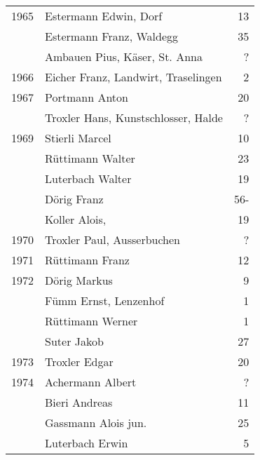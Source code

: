 {\begin{longtable}{ l l r }
        1965          & Estermann Edwin, Dorf                     & 13          \\
                      & Estermann Franz, Waldegg                  & 35          \\
                      & Ambauen Pius, Käser, St. Anna             & ?           \\
        1966          & Eicher Franz, Landwirt, Traselingen       & 2           \\
        1967          & Portmann Anton                            & 20          \\
                      & Troxler Hans, Kunstschlosser, Halde       & ?           \\
        1969          & Stierli Marcel                            & 10          \\
                      & Rüttimann Walter                          & 23          \\
                      & Luterbach Walter                          & 19          \\
                      & Dörig Franz                               & 56-         \\
                      & Koller Alois,                             & 19          \\
        1970          & Troxler Paul, Ausserbuchen                & ?           \\
        1971          & Rüttimann Franz                           & 12          \\
        1972          & Dörig Markus                              & 9           \\
                      & Fümm Ernst, Lenzenhof                     & 1           \\
                      & Rüttimann Werner                          & 1           \\
                      & Suter Jakob                               & 27          \\
        1973          & Troxler Edgar                             & 20          \\
        1974          & Achermann Albert                          & ?           \\
                      & Bieri Andreas                             & 11          \\
                      & Gassmann Alois jun.                       & 25          \\
                      & Luterbach Erwin                           & 5           \\

\end{longtable}}
